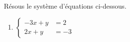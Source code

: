%
%
    Résous le système d'équations ci-dessous.
    \begin{enumerate}
        \item
              \(\left\{\begin{aligned}
                  -3x+y & = 2 \\
                  2x+y  & =-3
              \end{aligned}\right.\)
    \end{enumerate}
